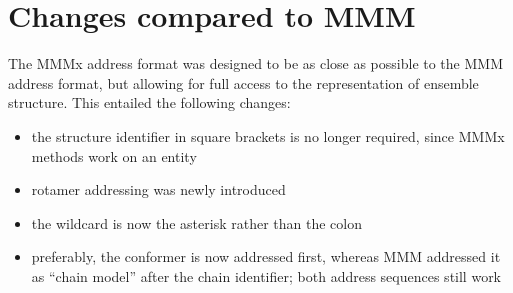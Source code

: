 \documentclass[letterpaper,10pt,english]{sphinxmanual}
\begin{document}
\section{Changes compared to MMM}
\label{\detokenize{object_access:changes-compared-to-mmm}}
The MMMx address format was designed to be as close as possible to the MMM address format, but allowing for full access to the  representation of ensemble structure.
This entailed the following changes:
\begin{itemize}
\item {} 
the structure identifier in square brackets is no longer required, since MMMx methods work on an entity

\item {} 
rotamer addressing was newly introduced

\item {} 
the wildcard is now the asterisk \sphinxcode{\sphinxupquote{*}} rather than the colon \sphinxcode{\sphinxupquote{:}}

\item {} 
preferably, the conformer is now addressed first, whereas MMM addressed it as “chain model” after the chain identifier; both address sequences still work

\end{itemize}
\end{document}
